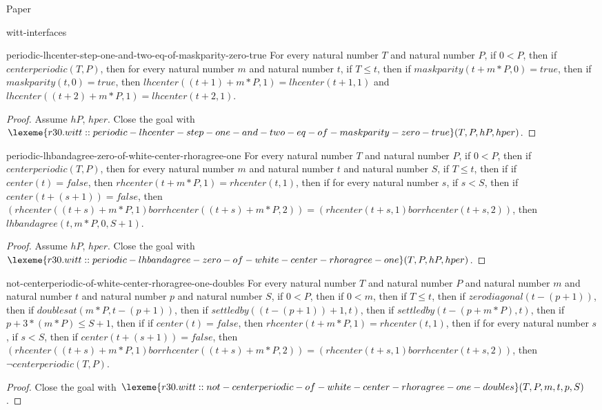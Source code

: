 \begin{lexlean}{Paper}
\begin{section}{witt-interfaces}
  \begin{theorem}{periodic-lhcenter-step-one-and-two-eq-of-maskparity-zero-true}
  For every natural number \(T\) and natural number \(P\), if \(0 < P\), then if \(centerperiodic(T, P)\), then for every natural number \(m\) and natural number \(t\), if \(T ≤ t\), then if \(maskparity(t + m * P, 0) = true\), then if \(maskparity(t, 0) = true\), then \(lhcenter((t + 1) + m * P, 1) = lhcenter(t + 1, 1)\) and \(lhcenter((t + 2) + m * P, 1) = lhcenter(t + 2, 1)\).
  \begin{proof}
  Assume \(hP\), \(hper\).
  Close the goal with \(\lexeme{r30.witt::periodic-lhcenter-step-one-and-two-eq-of-maskparity-zero-true}(T, P, hP, hper)\).
  \end{proof}
  \end{theorem}

  \begin{theorem}{periodic-lhbandagree-zero-of-white-center-rhoragree-one}
  For every natural number \(T\) and natural number \(P\), if \(0 < P\), then if \(centerperiodic(T, P)\), then for every natural number \(m\) and natural number \(t\) and natural number \(S\), if \(T ≤ t\), then if if \(center(t) = false\), then \(rhcenter(t + m * P, 1) = rhcenter(t, 1)\), then if for every natural number \(s\), if \(s < S\), then if \(center(t + (s + 1)) = false\), then \((rhcenter((t + s) + m * P, 1) bor rhcenter((t + s) + m * P, 2)) = (rhcenter(t + s, 1) bor rhcenter(t + s, 2))\), then \(lhbandagree(t, m * P, 0, S + 1)\).
  \begin{proof}
  Assume \(hP\), \(hper\).
  Close the goal with \(\lexeme{r30.witt::periodic-lhbandagree-zero-of-white-center-rhoragree-one}(T, P, hP, hper)\).
  \end{proof}
  \end{theorem}
  \begin{theorem}{not-centerperiodic-of-white-center-rhoragree-one-doubles}
  For every natural number \(T\) and natural number \(P\) and natural number \(m\) and natural number \(t\) and natural number \(p\) and natural number \(S\), if \(0 < P\), then if \(0 < m\), then if \(T ≤ t\), then if \(zerodiagonal(t - (p + 1))\), then if \(doublesat(m * P, t - (p + 1))\), then if \(settledby((t - (p + 1)) + 1, t)\), then if \(settledby(t - (p + m * P), t)\), then if \(p + 3 * (m * P) ≤ S + 1\), then if if \(center(t) = false\), then \(rhcenter(t + m * P, 1) = rhcenter(t, 1)\), then if for every natural number \(s\), if \(s < S\), then if \(center(t + (s + 1)) = false\), then \((rhcenter((t + s) + m * P, 1) bor rhcenter((t + s) + m * P, 2)) = (rhcenter(t + s, 1) bor rhcenter(t + s, 2))\), then \(¬centerperiodic(T, P)\).
  \begin{proof}
  Close the goal with \(\lexeme{r30.witt::not-centerperiodic-of-white-center-rhoragree-one-doubles}(T, P, m, t, p, S)\).
  \end{proof}
  \end{theorem}


\end{section}
\end{lexlean}
